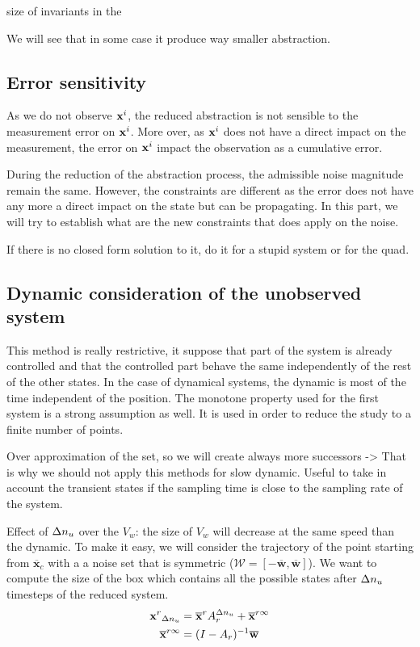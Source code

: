 size of invariants in the 


We will see that in some case it produce way smaller abstraction.

\subsection{Error sensitivity}
As we do not observe $ \mathbf{x}^i$, the reduced abstraction is not sensible to the measurement error on $ \mathbf{x}^i$. More over, as $ \mathbf{x}^i$ does not have a direct impact on the measurement, the error on $ \mathbf{x}^i$ impact the observation as a cumulative error.

During the reduction of the abstraction process, the admissible noise magnitude remain the same. However, the constraints are different as the error does not have any more a direct impact on the state but can be propagating.
In this part, we will try to establish what are the new constraints that does apply on the noise.

If there is no closed form solution to it, do it for a stupid system or for the quad.

\subsection{Dynamic consideration of the unobserved system}
This method is really restrictive, it suppose that part of the system is already controlled and that the controlled part behave the same independently of the rest of the other states. In the case of dynamical systems, the dynamic is most of the time independent of the position. 
The monotone property used for the first system is a strong assumption as well. It is used in order to reduce the study to a finite number of points.

Over approximation of the set, so we will create always more successors -> That is why we should not apply this methods for slow dynamic. Useful to take in account the transient states if the sampling time is close to the sampling rate of the system.

Effect of $\Delta n_u$ over the $V_w$: the size of $V_w$ will decrease at the same speed than the dynamic. To make it easy, we will consider the trajectory of the point starting from $\overline{\mathbf{x}}_c$ with a a noise set that is symmetric ($\mathcal{W} = \left [ -\overline{\mathbf{w}},\overline{\mathbf{w}} \right ]$). We want to compute the size of the box which contains all the possible states after $\Delta n_u$ timesteps of the reduced system.
\begin{equation}
\begin{split}
{\mathbf{x}^r}_{\Delta n_u} &= \overline{\mathbf{x}}^r A_r^{\Delta n_u} + \overline{\mathbf{x}}^{r \infty}\\
\overline{\mathbf{x}}^{r \infty} &= (I-A_r)^{-1}\overline{\mathbf{w}}
\end{split}
\end{equation}

